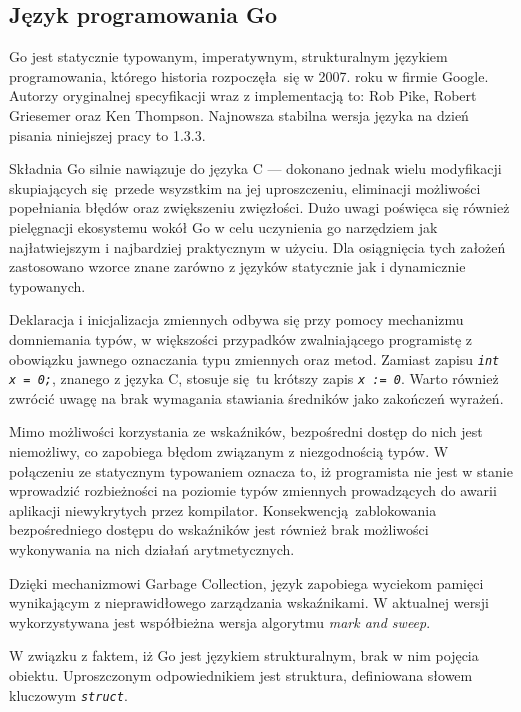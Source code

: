 \subsection{Język programowania Go} %
\label{ss_internals_go}
\par{
Go jest statycznie typowanym, imperatywnym, strukturalnym językiem programowania, którego historia rozpoczęła się w 2007. roku w firmie Google. Autorzy oryginalnej specyfikacji wraz z implementacją to: Rob Pike, Robert Griesemer oraz Ken Thompson.
Najnowsza stabilna wersja języka na dzień pisania niniejszej pracy to 1.3.3.
}
\par{
Składnia Go silnie nawiązuje do języka C --- dokonano jednak wielu modyfikacji skupiających się przede wsyzstkim na jej uproszczeniu, eliminacji możliwości popełniania błędów oraz zwiększeniu zwięzłości.
Dużo uwagi poświęca się również pielęgnacji ekosystemu wokół Go w celu uczynienia go narzędziem jak najłatwiejszym i najbardziej praktycznym w użyciu.
Dla osiągnięcia tych założeń zastosowano wzorce znane zarówno z języków statycznie jak i dynamicznie typowanych.
}
\par{Deklaracja i inicjalizacja zmiennych odbywa się przy pomocy mechanizmu domniemania typów, w większości przypadków zwalniającego programistę z obowiązku jawnego oznaczania typu zmiennych oraz metod. Zamiast zapisu \textit{\lstinline{int x = 0;}}, znanego z języka C, stosuje się tu krótszy zapis \textit{\lstinline{x := 0}}. Warto również zwrócić uwagę na brak wymagania stawiania średników jako zakończeń wyrażeń.
}
 \par{Mimo możliwości korzystania ze wskaźników, bezpośredni dostęp do nich jest niemożliwy, co zapobiega błędom związanym z niezgodnością typów. W połączeniu ze statycznym typowaniem oznacza to, iż programista nie jest w stanie wprowadzić rozbieżności na poziomie typów zmiennych prowadzących do awarii aplikacji niewykrytych przez kompilator. Konsekwencją zablokowania bezpośredniego dostępu do wskaźników jest również brak możliwości wykonywania na nich działań arytmetycznych.
 }
 \par{
Dzięki mechanizmowi Garbage Collection, język zapobiega wyciekom pamięci wynikającym z nieprawidłowego zarządzania wskaźnikami. W aktualnej wersji wykorzystywana jest współbieżna wersja algorytmu \textit{mark and sweep}.
}
\par{
 W związku z faktem, iż Go jest językiem strukturalnym, brak w nim pojęcia obiektu. Uproszczonym odpowiednikiem jest struktura, definiowana słowem kluczowym \textit{\lstinline{struct}}.
}
